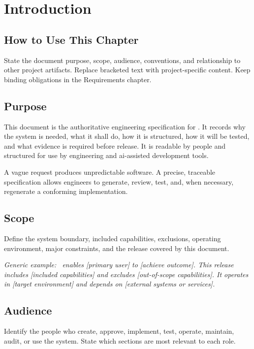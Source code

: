 \chapter{Introduction}

\section{How to Use This Chapter}
State the document purpose, scope, audience, conventions, and relationship to
other project artifacts. Replace bracketed text with project-specific content.
Keep binding obligations in the Requirements chapter.

\section{Purpose}
This document is the authoritative engineering specification for
\ProjectName. It records why the system is needed, what it shall do, how it is
structured, how it will be tested, and what evidence is required before
release. It is readable by people and structured for use by engineering and
\gls{ai}-assisted development tools.

\begin{dsnNote}
A vague request produces unpredictable software. A precise, traceable
specification allows engineers to generate, review, test, and, when necessary,
regenerate a conforming implementation.
\end{dsnNote}

\section{Scope}
Define the system boundary, included capabilities, exclusions, operating
environment, major constraints, and the release covered by this document.

\textit{Generic example: \ProjectName\ enables [primary user] to [achieve
outcome]. This release includes [included capabilities] and excludes
[out-of-scope capabilities]. It operates in [target environment] and depends
on [external systems or services].}

\section{Audience}
Identify the people who create, approve, implement, test, operate, maintain,
audit, or use the system. State which sections are most relevant to each role.


